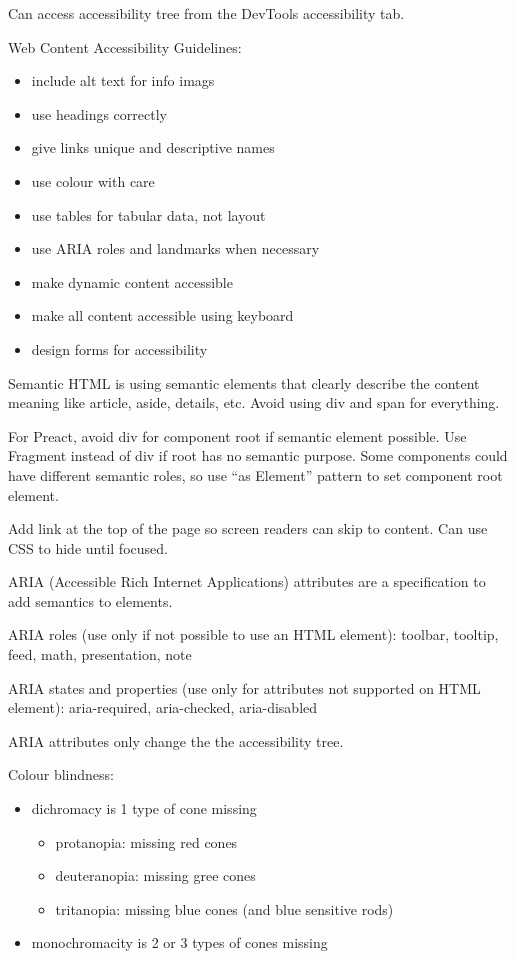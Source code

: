\documentclass[11pt]{article}
\begin{document}
Can access accessibility tree from the DevTools accessibility tab.

Web Content Accessibility Guidelines:
\begin{itemize}
\item include alt text for info imags
\item use headings correctly
\item give links unique and descriptive names
\item use colour with care
\item use tables for tabular data, not layout
\item use ARIA roles and landmarks when necessary
\item make dynamic content accessible
\item make all content accessible using keyboard
\item design forms for accessibility
\end{itemize}

Semantic HTML is using semantic elements that clearly describe the content meaning like
article, aside, details, etc. Avoid using div and span for everything.

For Preact, avoid div for component root if semantic element possible.
Use Fragment instead of div if root has no semantic purpose.
Some components could have different semantic roles, so use ``as Element'' pattern to set
component root element.

Add link at the top of the page so screen readers can skip to content.
Can use CSS to hide until focused.

ARIA (Accessible Rich Internet Applications) attributes are a specification to add
semantics to elements.

ARIA roles (use only if not possible to use an HTML element): toolbar, tooltip, feed,
math, presentation, note

ARIA states and properties (use only for attributes not supported on HTML element):
aria-required, aria-checked, aria-disabled

ARIA attributes only change the the accessibility tree.

Colour blindness:
\begin{itemize}
\item dichromacy is 1 type of cone missing
\begin{itemize}
\item protanopia: missing red cones
\item deuteranopia: missing gree cones
\item tritanopia: missing blue cones (and blue sensitive rods)
\end{itemize}
\item monochromacity is 2 or 3 types of cones missing
\end{itemize}
\end{document}
